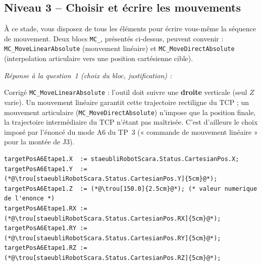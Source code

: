 \subsection{Niveau 3 -- Choisir et écrire les mouvements}

À ce stade, vous disposez de tous les éléments pour écrire vous-même la
séquence de mouvement. Deux blocs \texttt{MC\_}, présentés ci-dessus,
peuvent convenir : \texttt{MC\_MoveLinearAbsolute} (mouvement linéaire) et
\texttt{MC\_MoveDirectAbsolute} (interpolation articulaire vers une
position cartésienne cible).

\begin{UPSTIactivite}
\textit{Réponse à la question~1 (choix du bloc, justification) :}

\begin{UPSTIcorrectionP}{Corrigé}
\texttt{MC\_MoveLinearAbsolute} : l'outil doit suivre une \textbf{droite}
verticale (seul $Z$ varie). Un mouvement linéaire garantit cette
trajectoire rectiligne du TCP ; un mouvement articulaire
(\texttt{MC\_MoveDirectAbsolute}) n'impose que la position finale, la
trajectoire intermédiaire du TCP n'étant pas maîtrisée. C'est d'ailleurs le
choix imposé par l'énoncé du mode A6 du TP~3 (« commande de mouvement
linéaire » pour la montée de J3).
\end{UPSTIcorrectionP}
\begin{lstlisting}
targetPosA6Etape1.X  := staeubliRobotScara.Status.CartesianPos.X;
targetPosA6Etape1.Y  := (*@\trou[staeubliRobotScara.Status.CartesianPos.Y]{5cm}@*);
targetPosA6Etape1.Z  := (*@\trou[150.0]{2.5cm}@*); (* valeur numerique de l'enonce *)
targetPosA6Etape1.RX := (*@\trou[staeubliRobotScara.Status.CartesianPos.RX]{5cm}@*);
targetPosA6Etape1.RY := (*@\trou[staeubliRobotScara.Status.CartesianPos.RY]{5cm}@*);
targetPosA6Etape1.RZ := (*@\trou[staeubliRobotScara.Status.CartesianPos.RZ]{5cm}@*);
\end{lstlisting}


\end{UPSTIactivite}
